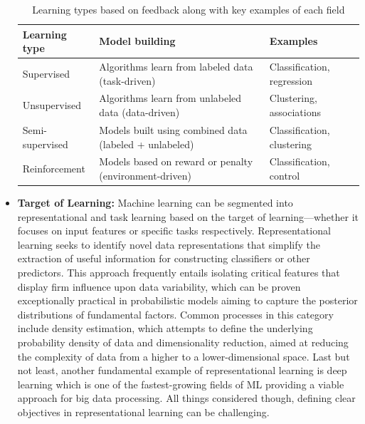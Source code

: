 \begin{itemize}
          \begin{table}[h!]
              \centering
              \begin{tabularx}{\textwidth}{>{\hsize=0.7\hsize\arraybackslash}X >{\hsize=1.8\hsize\arraybackslash}X >{\hsize=0.5\hsize\arraybackslash}X}
                  \toprule
                  \rowcolor{lightgray}
                  \textbf{Learning type} & \textbf{Model building}                                & \textbf{Examples}          \\
                  \midrule
                  Supervised             & Algorithms learn from labeled data (task-driven)       & Classification, regression \\
                  Unsupervised           & Algorithms learn from unlabeled data (data-driven)     & Clustering, associations   \\
                  Semi-supervised        & Models built using combined data (labeled + unlabeled) & Classification, clustering \\
                  Reinforcement          & Models based on reward or penalty (environment-driven) & Classification, control    \\
                  \bottomrule
              \end{tabularx}
              \caption{Learning types based on feedback along with key examples of each field}
              \label{table:feedback_taxonomy}
          \end{table}

    \item \textbf{Target of Learning:} Machine learning can be segmented into representational and task learning based on the target of learning—whether
          it focuses on input features or specific tasks respectively. Representational learning seeks to identify novel data representations that simplify
          the extraction of useful information for constructing classifiers or other predictors\cite{bengio_representational_learing_2013}. This approach
          frequently entails isolating critical features that display firm influence upon data variability, which can be proven exceptionally practical in
          probabilistic models aiming to capture the posterior distributions of fundamental factors. Common processes in this category include density
          estimation, which attempts to define the underlying probability density of data and dimensionality reduction, aimed at reducing the complexity
          of data from a higher to a lower-dimensional space. Last but not least, another fundamental example of representational learning is deep learning
          which is one of the fastest-growing fields of ML providing a viable approach for big data processing. All things considered though, defining clear
          objectives in representational learning can be challenging.


\end{itemize}

